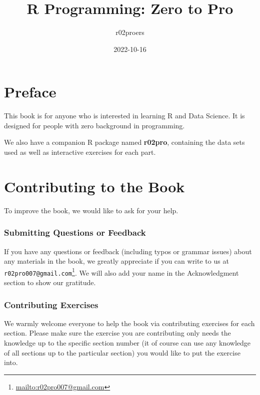 \documentclass[
]{book}
\title{R Programming: Zero to Pro}
\author{r02proers}
\date{2022-10-16}
\renewcommand{\href}[2]{#2\footnote{\url{#1}}}
\begin{document}
\maketitle

{
\hypersetup{linkcolor=}
\setcounter{tocdepth}{1}
\tableofcontents
}
\hypertarget{preface}{%
\chapter*{Preface}\label{preface}}

This book is for anyone who is interested in learning R and Data Science. It is designed for people with zero background in programming.

We also have a companion R package named \textbf{r02pro}, containing the data sets used as well as interactive exercises for each part.

\hypertarget{contributing-to-the-book}{%
\chapter*{Contributing to the Book}\label{contributing-to-the-book}}

To improve the book, we would like to ask for your help.

\hypertarget{submitting-questions-or-feedback}{%
\subsection*{Submitting Questions or Feedback}\label{submitting-questions-or-feedback}}

If you have any questions or feedback (including typos or grammar issues) about any materials in the book, we greatly appreciate if you can write to us at \href{mailto:r02pro007@gmail.com}{\nolinkurl{r02pro007@gmail.com}}. We will also add your name in the Acknowledgment section to show our gratitude.

\hypertarget{contributing-exercises}{%
\subsection*{Contributing Exercises}\label{contributing-exercises}}

We warmly welcome everyone to help the book via contributing exercises for each section. Please make sure the exercise you are contributing only needs the knowledge up to the specific section number (it of course can use any knowledge of all sections up to the particular section) you would like to put the exercise into.
\end{document}
